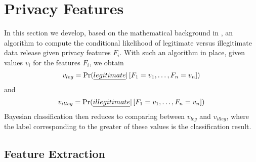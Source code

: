 \section{Privacy Features}\label{Se:algorithm}

In this section we develop, based on the mathematical background in , an algorithm to compute the conditional likelihood of legitimate versus illegitimate data release given privacy features $F_i$. With such an algorithm in place, given values $v_i$ for the features $F_i$, we obtain
$$
v_{leg} = \Pr(\emph{legitimate} | \left[ F_1=v_1,\ldots,F_n=v_n \right])
$$
and
$$
v_{illeg} = \Pr(\emph{illegitimate} | \left[ F_1=v_1,\ldots,F_n=v_n \right])
$$
Bayesian classification then reduces to comparing between $v_{leg}$ and $v_{illeg}$, where the label corresponding to the greater of these values is the classification result.



\subsection{Feature Extraction}\label{Se:featext}

